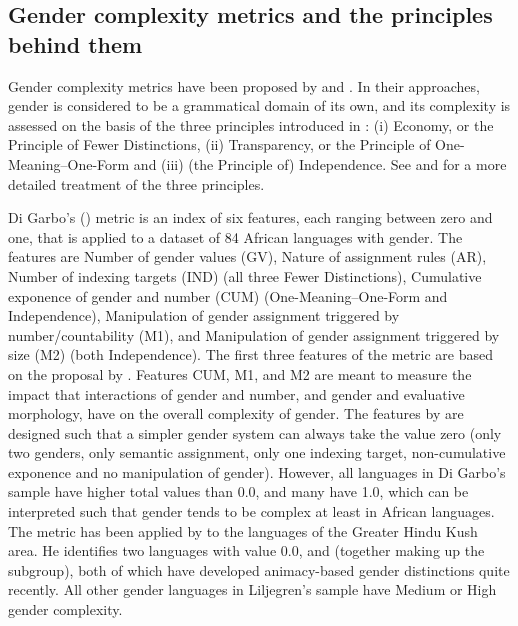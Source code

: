 \documentclass[output=collectionpaper]{langsci/langscibook}
\begin{document}
  \subsection{Gender complexity metrics and the principles behind them}
  \label{sec:WDG:2.2}

Gender complexity metrics have been proposed by \cite{Audring2014,Audring2017} and \cite{DiGarbo2014,DiGarbo2016}. In their approaches, gender is considered to be a grammatical domain of its own, and its complexity is assessed on the basis of the three principles introduced in : (i) Economy, or the Principle of Fewer Distinctions, (ii) Transparency, or the Principle of One-Meaning--One-Form and (iii) (the Principle of) Independence. See  and  for a more detailed treatment of the three principles.

Di Garbo's (\citeyear{DiGarbo2014,DiGarbo2016}) metric is an index of six features, each ranging between zero and one, that is applied to a dataset of 84 African languages with gender. The features are Number of gender values (GV), Nature of assignment rules (AR), Number of indexing targets (IND) (all three Fewer Distinctions), Cumulative exponence of gender and number (CUM) (One-Meaning--One-Form and Independence), Manipulation of gender assignment triggered by number/countability (M1), and Manipulation of gender assignment triggered by size (M2) (both Independence). The first three features of the metric are based on the proposal by \cite{Audring2014}. Features CUM, M1, and M2 are meant to measure the impact that interactions of gender and number, and gender and evaluative morphology, have on the overall complexity of gender. The features by \cite{DiGarbo2014,DiGarbo2016} are designed such that a simpler gender system can always take the value zero (only two genders, only semantic assignment, only one indexing target, non-cumulative exponence and no manipulation of gender). However, all languages in Di Garbo's sample have higher total values than 0.0, and many have 1.0, which can be interpreted such that gender tends to be complex at least in African languages. The metric has been applied by  to the languages of the Greater Hindu Kush area. He identifies two languages with value 0.0,  and  (together making up the  subgroup), both of which have developed animacy-based gender distinctions quite recently. All other gender languages in Liljegren's sample have Medium or High gender complexity.
\end{document}
